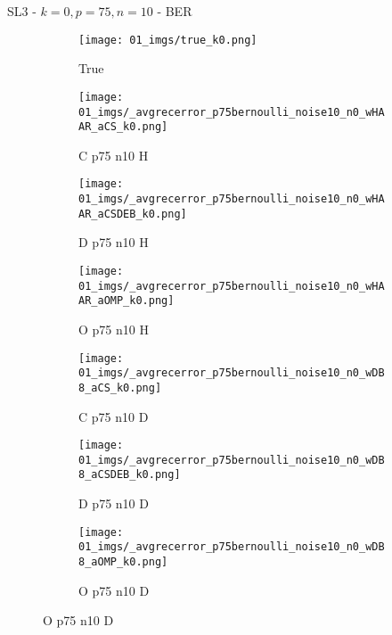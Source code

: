 \begin{frame}{SL3 - $k=0,p=75,n=10$ - BER}{}
\begin{figure}
\begin{subfigure}{0.13\textwidth}
\texttt{[image: 01\_imgs/true\_k0.png]}
\caption*{\tiny True}
\end{subfigure}
\begin{subfigure}{0.13\textwidth}
\texttt{[image: 01\_imgs/\_avgrecerror\_p75bernoulli\_noise10\_n0\_wHAAR\_aCS\_k0.png]}
\caption*{\tiny C p75 n10 H}
\end{subfigure}
\begin{subfigure}{0.13\textwidth}
\texttt{[image: 01\_imgs/\_avgrecerror\_p75bernoulli\_noise10\_n0\_wHAAR\_aCSDEB\_k0.png]}
\caption*{\tiny D p75 n10 H}
\end{subfigure}
\begin{subfigure}{0.13\textwidth}
\texttt{[image: 01\_imgs/\_avgrecerror\_p75bernoulli\_noise10\_n0\_wHAAR\_aOMP\_k0.png]}
\caption*{\tiny O p75 n10 H}
\end{subfigure}
\begin{subfigure}{0.13\textwidth}
\texttt{[image: 01\_imgs/\_avgrecerror\_p75bernoulli\_noise10\_n0\_wDB8\_aCS\_k0.png]}
\caption*{\tiny C p75 n10 D}
\end{subfigure}
\begin{subfigure}{0.13\textwidth}
\texttt{[image: 01\_imgs/\_avgrecerror\_p75bernoulli\_noise10\_n0\_wDB8\_aCSDEB\_k0.png]}
\caption*{\tiny D p75 n10 D}
\end{subfigure}
\begin{subfigure}{0.13\textwidth}
\texttt{[image: 01\_imgs/\_avgrecerror\_p75bernoulli\_noise10\_n0\_wDB8\_aOMP\_k0.png]}
\caption*{\tiny O p75 n10 D}
\end{subfigure}

\vspace{5pt}


\end{figure}
\end{frame}
